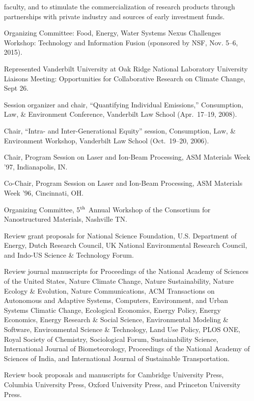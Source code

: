   faculty, and to stimulate the commercialization of research products through
  partnerships with private industry and sources of early investment funds.
\item[2015] Organizing Committee:
  Food, Energy, Water Systems Nexus Challenges Workshop: Technology and
  Information Fusion (sponsored by NSF, Nov. 5--6, 2015).
\item[2007] Represented Vanderbilt University at Oak Ridge National Laboratory
  University Liaisons Meeting: Opportunities for Collaborative Research on
  Climate Change, Sept 26.
\item[2008] Session organizer and chair, ``Quantifying Individual Emissions,''
  Consumption, Law, \& Environment Conference, Vanderbilt Law School
  (Apr.\ 17--19, 2008).
\item[2006] Chair, ``Intra- and Inter-Generational Equity'' session,
  Consumption, Law, \& Environment Workshop, Vanderbilt Law School
  (Oct.~19--20, 2006).
\item[1997] Chair, Program Session on Laser and Ion-Beam Processing,
  ASM Materials Week '97, In\-di\-an\-a\-po\-lis, IN.
\item[1996] Co-Chair, Program Session on Laser and Ion-Beam Processing,
  ASM Materials Week '96, Cincinnati, OH.
\item[1996] Organizing Committee,
   5$^{\mbox{\scriptsize th}}$ Annual Workshop of the Consortium for
   Nanostructured Materials, Nashville TN.
\item[Ongoing] Review grant proposals for National Science Foundation,
  U.S. Department of Energy,
  Dutch Research Council,
  UK National Environmental Research Council,
  and Indo-US Science \& Technology Forum.
\item[Ongoing] Review journal manuscripts for
  Proceedings of the National Academy of Sciences of the United States,
  Nature Climate Change,
  Nature Sustainability,
  Nature Ecology \& Evolution,
  Nature Communications,
  ACM Transactions on Autonomous and Adaptive Systems,
  Computers, Environment, and Urban Systems
  Climatic Change,
  Ecological Economics,
  Energy Policy,
  Energy Economics,
  Energy Research \& Social Science,
  Environmental Modeling \& Software,
  Environmental Science \& Technology,
  Land Use Policy,
  PLOS ONE,
  Royal Society of Chemistry,
  Sociological Forum,
  Sustainability Science,
  International Journal of Biometeorology,
  Proceedings of the National Academy of Sciences of India,
  and
  International Journal of Sustainable Transportation.
\item[Ongoing] Review book proposals and manuscripts for
  Cambridge University Press,
  Columbia University Press,
  Oxford University Press,
  and Princeton University Press.
